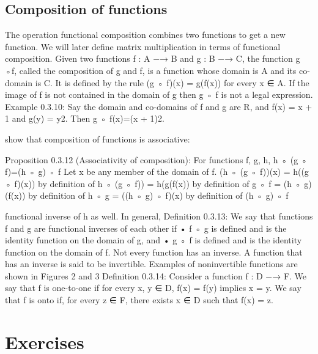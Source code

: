 \subsection{Composition of functions}  
The operation functional composition combines two functions to get a new function. We will later  define matrix multiplication in terms of functional composition. Given two functions f : A −→ B  and g : B −→ C, the function g ◦f, called the composition of g and f, is a function whose domain  is A and its co-domain is C. It is defined by the rule  (g ◦ f)(x) = g(f(x))  for every x ∈ A.  If the image of f is not contained in the domain of g then g ◦ f is not a legal expression.  Example 0.3.10: Say the domain and co-domains of f and g are R, and f(x) = x + 1 and  g(y) = y2. Then g ◦ f(x)=(x + 1)2. 

show that composition of functions is associative:  

Proposition 0.3.12 (Associativity of composition): For functions f, g, h,  h ◦ (g ◦ f)=(h ◦ g) ◦ f 
Let x be any member of the domain of f.  
(h ◦ (g ◦ f))(x) = h((g ◦ f)(x)) by definition of h ◦ (g ◦ f))  
                 = h(g(f(x)) by definition of g ◦ f  
                 = (h ◦ g)(f(x)) by definition of h ◦ g  
                 = ((h ◦ g) ◦ f)(x) by definition of (h ◦ g) ◦ f 
                 
functional inverse of h as well.  In general,  Definition 0.3.13: We say that functions f and g are functional inverses of each other if  • f ◦ g is defined and is the identity function on the domain of g, and  • g ◦ f is defined and is the identity function on the domain of f.  Not every function has an inverse. A function that has an inverse is said to be invertible.  Examples of noninvertible functions are shown in Figures 2 and 3  Definition 0.3.14: Consider a function f : D −→ F. We say that f is one-to-one if for every  x, y ∈ D, f(x) = f(y) implies x = y. We say that f is onto if, for every z ∈ F, there exists  x ∈ D such that f(x) = z. 

\section{Exercises}
\begin{ExerciseList}
\end{ExerciseList}
